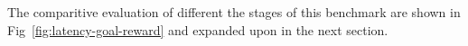The comparitive evaluation of different the stages of this benchmark are shown in Fig~\ref{fig:latency-goal-reward} and expanded upon in the next section.

%
%        

